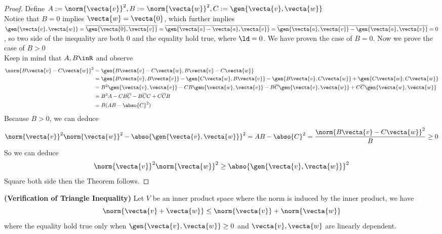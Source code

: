 \documentclass{report}
\begin{document}
\begin{proof}
Define $A:=\norm{\vecta{v}}^2,B:=\norm{\vecta{w}}^2,C:=\gen{\vecta{v},\vecta{w}}$\\

Notice that $B=0$ implies $\vecta{w}=\vecta{0}$, which further implies $\gen{\vecta{v},\vecta{w}}=\overline{\gen{\vecta{0},\vecta{v}}}=\overline{\gen{\vecta{a}-\vecta{a},\vecta{v}}}=\overline{\gen{\vecta{a},\vecta{v}}-\gen{\vecta{a},\vecta{v}}}=0$, so two side of the inequality are both  $0$ and the equality hold true, where $\ld =0$. We have proven the case of $B=0$. Now we prove the case of $B>0$\\

Keep in mind that $A,B\inR$ and observe
\begin{align*}
\norm{B\vecta{v}-C\vecta{w}}^2&=\gen{B\vecta{v}-C\vecta{w},B\vecta{v}-C\vecta{w}}\\
&=\gen{B\vecta{v},B\vecta{v}}-\gen{C\vecta{w},B\vecta{v}}-\gen{B\vecta{v},C\vecta{w}}+\gen{C\vecta{w},C\vecta{w}}\\
&=B^2\gen{\vecta{v},\vecta{v}}-CB\gen{\vecta{w},\vecta{v}}-B\overline{C}\gen{\vecta{v},\vecta{w}}+C\overline{C}\gen{\vecta{w},\vecta{w}}\\
&=B^2A-CB\overline{C}-B\overline{C}C+C\overline{C}B\\
&=B(AB-\abso{C}^2)
\end{align*}
Because $B>0$, we can deduce 
 \begin{equation*}
\norm{\vecta{v}}^2\norm{\vecta{w}}^2-\abso{\gen{\vecta{v},\vecta{w}}}^2=AB-\abso{C}^2=\frac{\norm{B\vecta{v}-C\vecta{w}}^2}{B}\geq 0
\end{equation*}
So we can deduce
\begin{equation*}
\norm{\vecta{v}}^2\norm{\vecta{w}}^2\geq \abso{\gen{\vecta{v},\vecta{w}}}^2
\end{equation*}
Square both side then the Theorem follows. 
\end{proof}
\begin{corollary}
\label{1.6.13}
\textbf{(Verification of Triangle Inequality)} Let $V$ be an inner product space where the norm is induced by the inner product, we have 
 \begin{equation*}
   \norm{\vecta{v}+\vecta{w}}\leq\norm{\vecta{v}}+\norm{\vecta{w}}
\end{equation*}
where the equality hold true only when $\gen{\vecta{v},\vecta{w}}\geq 0$ and $\vecta{v},\vecta{w}$ are linearly dependent.
\end{corollary}
\end{document}
